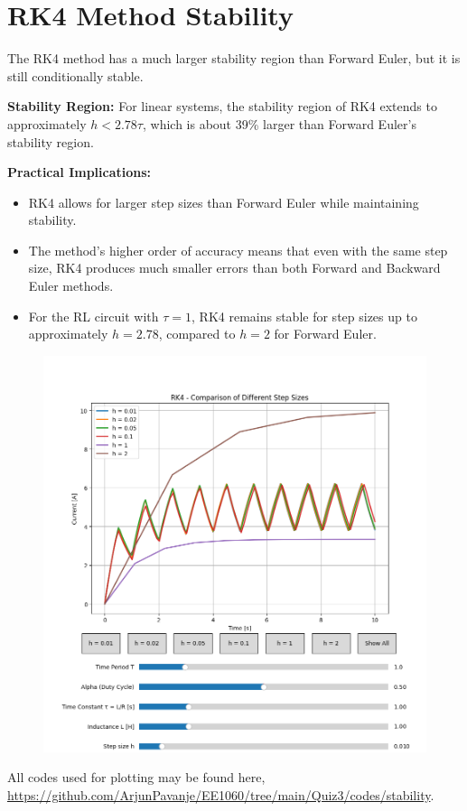 \documentclass[12pt,a4paper]{report}
\begin{document}
\section{RK4 Method Stability}
The RK4 method has a much larger stability region than Forward Euler, but it is still conditionally stable.

\textbf{Stability Region:}
For linear systems, the stability region of RK4 extends to approximately $h < 2.78\tau$, which is about 39\% larger than Forward Euler's stability region.

\textbf{Practical Implications:}
\begin{itemize}
    \item RK4 allows for larger step sizes than Forward Euler while maintaining stability.
    \item The method's higher order of accuracy means that even with the same step size, RK4 produces much smaller errors than both Forward and Backward Euler methods.
    \item For the RL circuit with $\tau = 1$, RK4 remains stable for step sizes up to approximately $h = 2.78$, compared to $h = 2$ for Forward Euler.
\end{itemize}
\pagebreak
\begin{figure}[h!]
\centering
\includegraphics[scale=0.6]{figs/rk4_stability.png}
\end{figure}
All codes used for plotting may be found here, \url{https://github.com/ArjunPavanje/EE1060/tree/main/Quiz3/codes/stability}.
\end{document}

